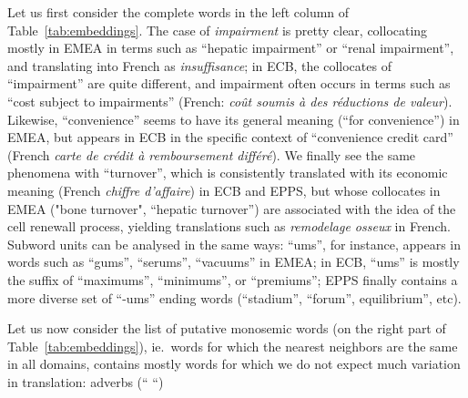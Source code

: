 \documentclass[11pt,a4paper]{article}
\begin{document}
Let us first consider the complete words in the left column of Table~\ref{tab:embeddings}. The case of \emph{impairment} is pretty clear, collocating mostly in EMEA in terms such as ``hepatic impairment'' or ``renal impairment'', and translating into French as \textsl{insuffisance}; in ECB, the collocates of ``impairment'' are quite different, and impairment often occurs in terms such as ``cost subject to impairments'' (French: \emph{coût soumis à des réductions de valeur}). Likewise, ``convenience'' seems to have its general meaning (``for convenience'') in EMEA, but appears in ECB in the specific context of ``convenience credit card'' (French \textsl{carte de crédit à remboursement différé}). We finally see the same phenomena with ``turnover'', which is consistently translated with its economic meaning (French \textsl{chiffre d'affaire}) in ECB and EPPS, but whose collocates in EMEA ("bone turnover", ``hepatic turnover'') are associated with the idea of the cell renewall process, yielding translations such as \textsl{remodelage osseux} in French. Subword units can be analysed in the same ways: ``ums'', for instance, appears in words such as ``gums'', ``serums'', ``vacuums''  in EMEA; in ECB, ``ums'' is mostly the suffix of ``maximums'', ``minimums'', or ``premiums''; EPPS finally contains a more diverse set of ``-ums'' ending words (``stadium'', ``forum'', equilibrium'', etc). 

Let us now consider the list of putative monosemic words (on the right part of Table~\ref{tab:embeddings}), ie.\ words for which the nearest neighbors are the same in all domains, contains mostly words for which we do not expect much variation in translation: adverbs (`` ``) 
\end{document}
